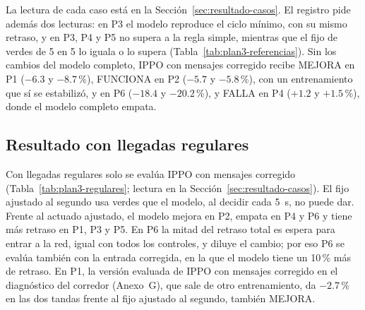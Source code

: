 La lectura de cada caso está en la Sección~\ref{sec:resultado-casos}.
El registro pide además dos lecturas: en P3 el modelo reproduce el
ciclo mínimo, con su mismo retraso, y en P3, P4 y P5 no supera a la
regla simple, mientras que el fijo de verdes de 5 en 5 lo iguala o lo
supera (Tabla~\ref{tab:plan3-referencias}). Sin los cambios del modelo
completo, IPPO con mensajes corregido recibe MEJORA en P1 ($-6.3$ y
$-8.7$\,\%), FUNCIONA en P2 ($-5.7$ y $-5.8$\,\%), con un entrenamiento
que sí se estabilizó, y en P6 ($-18.4$ y $-20.2$\,\%), y FALLA en P4
($+1.2$ y $+1.5$\,\%), donde el modelo completo empata.

\subsection*{Resultado con llegadas regulares}

Con llegadas regulares solo se evalúa IPPO con mensajes corregido
(Tabla~\ref{tab:plan3-regulares}; lectura en la
Sección~\ref{sec:resultado-casos}). El fijo ajustado al segundo usa
verdes que el modelo, al decidir cada 5~s, no puede dar. Frente al
actuado ajustado, el modelo mejora en P2, empata en P4 y P6 y tiene más
retraso en P1, P3 y P5. En P6 la mitad del retraso total es espera para
entrar a la red, igual con todos los controles, y diluye el cambio; por
eso P6 se evalúa también con la entrada corregida, en la que el modelo
tiene un 10\,\% más de retraso. En P1, la versión evaluada de IPPO con
mensajes corregido en el diagnóstico del corredor (Anexo~G), que sale de
otro entrenamiento, da $-2.7$\,\% en las dos tandas frente al fijo
ajustado al segundo, también MEJORA.

\begin{table}[H]
\centering
\footnotesize
\setlength{\tabcolsep}{3pt}

\caption[Segundo estudio: resultado con llegadas regulares]{Resultado con llegadas regulares: cambio del retraso total de IPPO con mensajes corregido frente al fijo ajustado al segundo, con su IC95, en cada tanda de 30 semillas. Las columnas se leen como en la Tabla~\ref{tab:plan3-aleatorias}. En la última fila, cada vehículo entra por el carril que le conviene.}
\label{tab:plan3-regulares}
\end{table}

